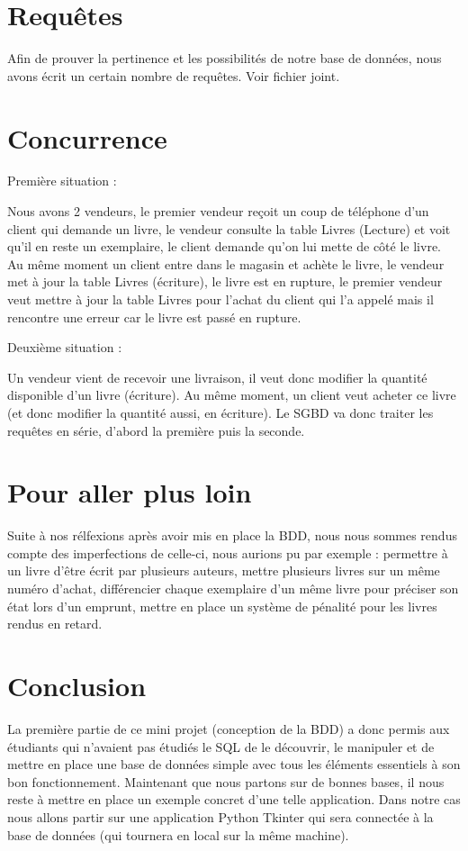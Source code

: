 \documentclass[10pt,a4paper,parskip=full*,DIV=11]{scrartcl}
\begin{document}
\section{Requêtes}
Afin de prouver la pertinence et les possibilités de notre base de données, nous avons écrit un certain nombre de requêtes. Voir fichier joint.

\section{Concurrence}
Première situation :

Nous avons 2 vendeurs, le premier vendeur reçoit un coup de téléphone d'un client qui demande un livre, le vendeur consulte la table Livres (Lecture) et voit qu'il en reste un exemplaire, le client
 demande qu'on lui mette de côté le livre.
Au même moment un client entre dans le magasin et achète le livre, le vendeur met à jour la table Livres (écriture), le livre est en rupture, le premier vendeur veut mettre à jour la table Livres 
pour l'achat du client qui l'a appelé mais il rencontre une erreur car le
livre est passé en rupture.

Deuxième situation :

Un vendeur vient de recevoir une livraison, il veut donc modifier la quantité disponible d'un livre (écriture). Au même moment, un client veut acheter ce livre (et donc modifier la quantité aussi, 
en écriture). Le SGBD va donc traiter les requêtes en série, d'abord la première puis la seconde.

\section{Pour aller plus loin}
Suite à nos rélfexions après avoir mis en place la BDD, nous nous sommes rendus compte des imperfections de celle-ci, nous aurions pu par exemple :
permettre à un livre d'être écrit par plusieurs auteurs, mettre plusieurs livres sur un même numéro d'achat, différencier chaque exemplaire d'un même livre pour préciser son état lors d'un emprunt,
mettre en place un système de pénalité pour les livres rendus en retard.

\section{Conclusion}
La première partie de ce mini projet (conception de la BDD) a donc permis aux étudiants qui n'avaient pas étudiés le SQL de le découvrir, le manipuler et de mettre en place une base
de données simple avec tous les éléments essentiels à son bon fonctionnement.
Maintenant que nous partons sur de bonnes bases, il nous reste à mettre en place un exemple concret d'une telle application. Dans notre cas nous allons partir sur une application Python Tkinter qui sera
connectée à la base de données (qui tournera en local sur la même machine).
\end{document}
